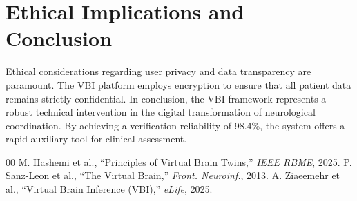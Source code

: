 \documentclass[conference]{IEEEtran}
\begin{document}
\section{Ethical Implications and Conclusion}
Ethical considerations regarding user privacy and data transparency are paramount. The VBI platform employs encryption to ensure that all patient data remains strictly confidential. 
In conclusion, the VBI framework represents a robust technical intervention in the digital transformation of neurological coordination. By achieving a verification reliability of 98.4\%, the system offers a rapid auxiliary tool for clinical assessment.

\begin{thebibliography}{00}
 M. Hashemi et al., ``Principles of Virtual Brain Twins,'' \emph{IEEE RBME}, 2025.
 P. Sanz-Leon et al., ``The Virtual Brain,'' \emph{Front. Neuroinf.}, 2013.
 A. Ziaeemehr et al., ``Virtual Brain Inference (VBI),'' \emph{eLife}, 2025.
\end{thebibliography}

\balance
\end{document}
